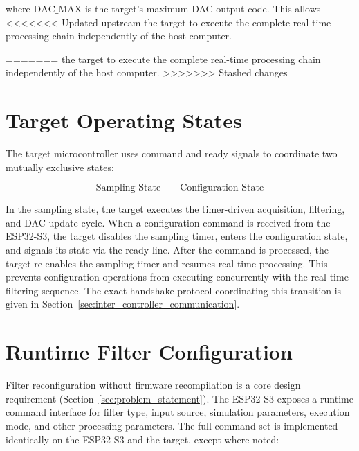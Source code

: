 where $\text{DAC\_MAX}$ is the target's maximum DAC output code. This allows
<<<<<<< Updated upstream
the target to execute the complete real-time processing chain independently
of the host computer. 

=======
the target to execute the complete real-time processing chain independently of
the host computer.
>>>>>>> Stashed changes


\section{Target Operating States}
\label{sec:target_operating_state}

The target microcontroller uses command and ready signals to coordinate two
mutually exclusive states:

\begin{equation}
    \boxed{\text{Sampling State}}
    \qquad
    \boxed{\text{Configuration State}}
    \label{eq:target_states}
\end{equation}

In the sampling state, the target executes the timer-driven acquisition,
filtering, and DAC-update cycle. When a configuration command is received from
the ESP32-S3, the target disables the sampling timer, enters the configuration
state, and signals its state via the ready line. After the command is
processed, the target re-enables the sampling timer and resumes real-time
processing. This prevents configuration operations from executing concurrently
with the real-time filtering sequence. The exact handshake protocol
coordinating this transition is given in
Section~\ref{sec:inter_controller_communication}.


\section{Runtime Filter Configuration}
\label{sec:runtime_filter_configuration}

Filter reconfiguration without firmware recompilation is a core design
requirement (Section~\ref{sec:problem_statement}). The ESP32-S3 exposes a
runtime command interface for filter type, input source, simulation parameters,
execution mode, and other processing parameters. The full command set is
implemented identically on the ESP32-S3 and the target, except where noted:


